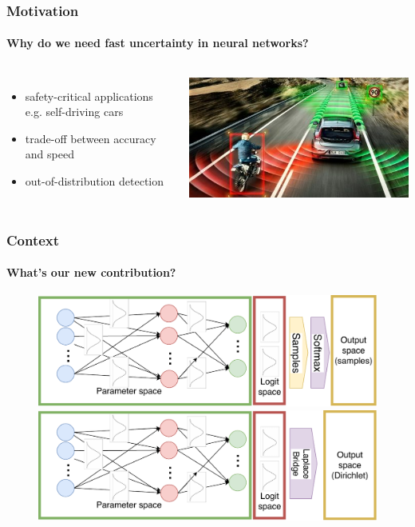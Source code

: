 \documentclass[10pt,usepdftitle=false,aspectratio=169,handout]{beamer}
\begin{document}
\setlength{\figurewidth}{.9\textwidth}
\setlength{\figureheight}{.6\textheight}


\begin{frame}\frametitle{Motivation}
    \framesubtitle{Why do we need fast uncertainty in neural networks?}
    \begin{columns}
		\begin{itemize}
			\item safety-critical applications e.g. self-driving cars
			\item trade-off between accuracy and speed
			\item out-of-distribution detection
		\end{itemize}
    	\includegraphics[width=\textwidth]{../figures/self-driving_car.jpg}
    \end{columns}
\end{frame}


\begin{frame}\frametitle{Context}
	\framesubtitle{What's our new contribution?}
	\begin{figure}
		\centering
		\includegraphics[height=0.4\textheight]{../figures/GaussNN_classic_slim.pdf}\\
		\vspace{4pt}
		\includegraphics[height=0.4\textheight]{../figures/GaussNN_LaplaceBridge_slim.pdf}
	\end{figure}
\end{frame}
\end{document}
